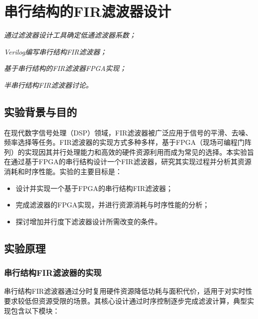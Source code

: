 \chapter{串行结构的FIR滤波器设计}
\begin{introduction}
    \item \textit{通过滤波器设计工具确定低通滤波器系数；}
    \item \textit{Verilog编写串行结构FIR滤波器；}
    \item \textit{基于串行结构的FIR滤波器FPGA实现；}
    \item \textit{半串行结构FIR滤波器讨论。}
\end{introduction}
\section{实验背景与目的}
在现代数字信号处理（DSP）领域，FIR滤波器被广泛应用于信号的平滑、去噪、频率选择等任务。FIR滤波器的实现方式多种多样，基于FPGA（现场可编程门阵列）的实现因其并行处理能力和高效的硬件资源利用而成为常见的选择。本实验旨在通过基于FPGA的串行结构设计一个FIR滤波器，研究其实现过程并分析其资源消耗和时序性能。实验的主要目标是：
\begin{itemize}
    \item 设计并实现一个基于FPGA的串行结构FIR滤波器；
    \item 完成滤波器的FPGA实现，并进行资源消耗与时序性能的分析；
    \item 探讨增加并行度下滤波器设计所需改变的条件。
\end{itemize}
\section{实验原理}
\subsection{串行结构FIR滤波器的实现}

串行结构FIR滤波器通过分时复用硬件资源降低功耗与面积代价，适用于对实时性要求较低但资源受限的场景。其核心设计通过时序控制逐步完成滤波计算，典型实现包含以下模块：

